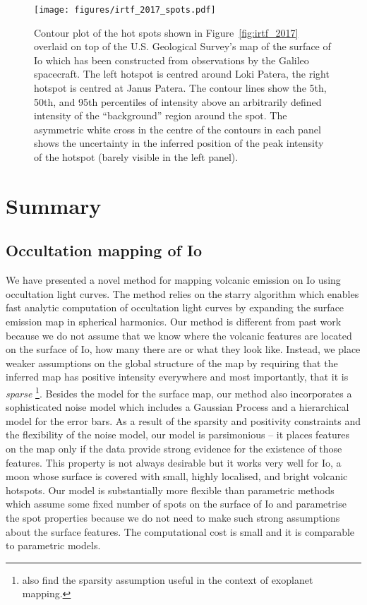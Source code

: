 \documentclass[12pt,dvipsnames]{report}
\begin{document}
\begin{figure}[t!]
    \begin{centering}
    \texttt{[image: figures/irtf\_2017\_spots.pdf]}
    \caption{
        Contour plot of the hot spots shown in Figure~\ref{fig:irtf_2017} overlaid on top of the U.S. Geological Survey's map of the surface of Io which has been constructed from observations by the Galileo spacecraft.
        The left hotspot is centred around Loki Patera, the right hotspot is centred at Janus Patera.
The contour lines show the 5th, 50th, and 95th percentiles of intensity above an arbitrarily defined intensity of the ``background'' region around the spot.
        The asymmetric white cross in the centre of the contours in each panel shows the uncertainty in the inferred position of the peak intensity of the hotspot (barely visible in the left panel).
    }
        \label{fig:irtf_2017_spots}
    \end{centering}
\end{figure}


\section{Summary}
\label{sec:io_summary}
\subsection{Occultation mapping of Io}
We have presented a novel method for mapping volcanic emission on Io using occultation light curves.
The method relies on the \textsf{starry} algorithm which enables fast analytic computation of occultation light curves by expanding the surface emission map in spherical harmonics.
Our method is different from past work because we do not assume that we know where the volcanic features are located on the surface of Io, how many there are or what they look like.
Instead, we place weaker assumptions on the global structure of the map by requiring that the inferred map has positive intensity everywhere and most importantly, that it is \emph{sparse} \footnote{\citet{aizawa2020} also find the sparsity assumption useful in the context of exoplanet mapping.}.
Besides the model for the surface map, our method also incorporates a sophisticated noise model which includes a Gaussian Process and a hierarchical model for the error bars.
As a result of the sparsity and positivity constraints and the flexibility of the noise model,
our model is parsimonious -- it places features on the map only if the data provide strong evidence for the existence of those features.
This property is not always desirable but it works very well for Io, a moon whose surface is covered with small, highly localised, and bright volcanic hotspots.
Our model is substantially more flexible than parametric methods which assume some fixed number of spots on the surface of Io and parametrise the spot properties because we do not need to make such strong assumptions about the surface features.
The computational cost is small and it is comparable to parametric models.
\end{document}
